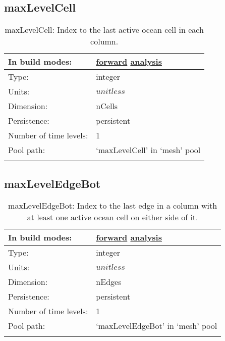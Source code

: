 \subsection[maxLevelCell]{maxLevelCell}
\label{subsec:var_sec_mesh_maxLevelCell}
\begin{center}
\begin{longtable}{| p{2.0in} | p{4.0in} |}
        \hline 
        In build modes: & \hyperref[subsec:forward_var_tab_mesh]{forward} \hyperref[subsec:analysis_var_tab_mesh]{analysis} \\
        \hline 
        Type: & integer \\
        \hline 
        Units: & $unitless$ \\
        \hline 
        Dimension: & nCells \\
        \hline 
        Persistence: & persistent \\
        \hline 
        Number of time levels: & 1 \\
        \hline 
            Pool path: & `maxLevelCell' in `mesh' pool \\
		 \hline 
    \caption{maxLevelCell: Index to the last active ocean cell in each column.}
\end{longtable}
\end{center}
\subsection[maxLevelEdgeBot]{maxLevelEdgeBot}
\label{subsec:var_sec_mesh_maxLevelEdgeBot}
\begin{center}
\begin{longtable}{| p{2.0in} | p{4.0in} |}
        \hline 
        In build modes: & \hyperref[subsec:forward_var_tab_mesh]{forward} \hyperref[subsec:analysis_var_tab_mesh]{analysis} \\
        \hline 
        Type: & integer \\
        \hline 
        Units: & $unitless$ \\
        \hline 
        Dimension: & nEdges \\
        \hline 
        Persistence: & persistent \\
        \hline 
        Number of time levels: & 1 \\
        \hline 
            Pool path: & `maxLevelEdgeBot' in `mesh' pool \\
		 \hline 
    \caption{maxLevelEdgeBot: Index to the last edge in a column with at least one active ocean cell on either side of it.}
\end{longtable}
\end{center}
